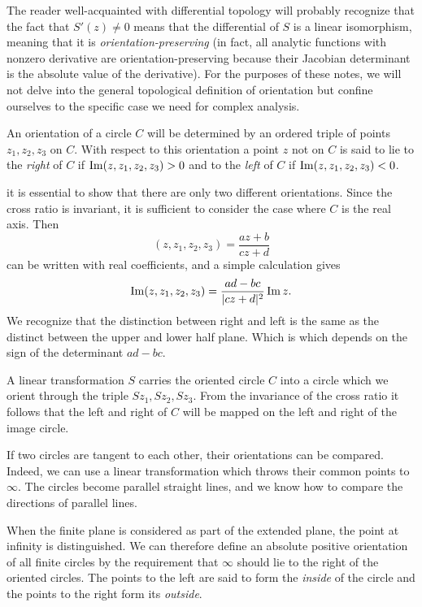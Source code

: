 The reader well-acquainted with differential topology will probably recognize that the fact that $S'(z) \neq 0$ means that the differential of $S$ is a linear isomorphism, meaning that it is \emph{orientation-preserving} (in fact, all analytic functions with nonzero derivative are orientation-preserving because their Jacobian determinant is the absolute value of the derivative). For the purposes of these notes, we will not delve into the general topological definition of orientation but confine ourselves to the specific case we need for complex analysis.

An orientation of a circle $C$ will be determined by an ordered triple of points $z_1,z_2,z_3$ on $C$. With respect to this orientation a point $z$ not on $C$ is said to lie to the \emph{right} of $C$ if $\operatorname{Im} (z,z_1,z_2,z_3)>0$ and to the \emph{left} of $C$ if $\operatorname{Im} (z,z_1,z_2,z_3)<0$.

it is essential to show that there are only two different orientations. Since the cross ratio is invariant, it is sufficient to consider the case where $C$ is the real axis. Then $$(z,z_1,z_2,z_3)=\dfrac{az+b}{cz+d}$$ can be written with real coefficients, and a simple calculation gives $$\operatorname{Im} (z, z_1,z_2,z_3)=\dfrac{ad-bc}{\lvert cz+d \rvert^2}\operatorname{Im} z.$$ We recognize that the distinction between right and left is the same as the distinct between the upper and lower half plane. Which is which depends on the sign of the determinant $ad-bc$.

A linear transformation $S$ carries the oriented circle $C$ into a circle which we orient through the triple $Sz_1,Sz_2,Sz_3$. From the invariance of the cross ratio it follows that the left and right of $C$ will be mapped on the left and right of the image circle.

If two circles are tangent to each other, their orientations can be compared. Indeed, we can use a linear transformation which throws their common points to $\infty$. The circles become parallel straight lines, and we know how to compare the directions of parallel lines.

When the finite plane is considered as part of the extended plane, the point at infinity is distinguished. We can therefore define an absolute positive orientation of all finite circles by the requirement that $\infty$ should lie to the right of the oriented circles. The points to the left are said to form the \emph{inside} of the circle and the points to the right form its \emph{outside}.


